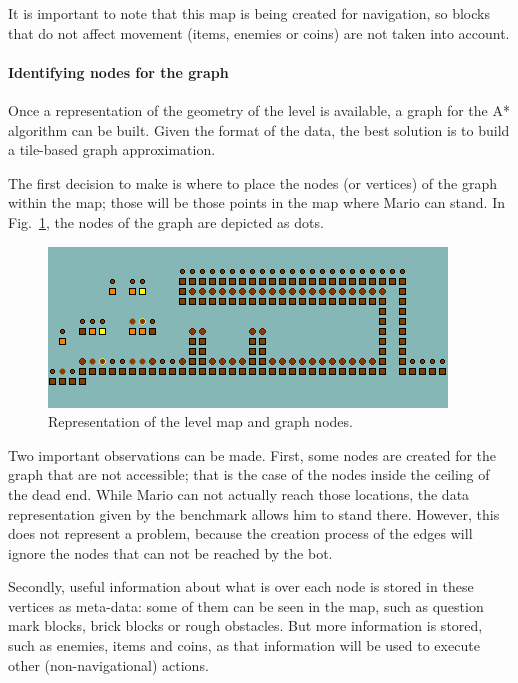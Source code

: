 \documentclass[conference]{IEEEtran}
\begin{document}
It is important to note that this map is being created for navigation, so
blocks that do not affect movement (items, enemies or 
coins) are not taken into account.

\paragraph{Identifying nodes for the graph}

Once a representation of the geometry of the level is available,
a graph for the A* algorithm can be built. Given the format of the data, the
best solution is to build a tile-based graph approximation.

The first decision to make is where to place the nodes (or vertices) of the graph 
within the map; those will be those points in the map where
Mario can stand. In Fig.~\ref{fig:trapNodes}, the nodes of the graph are
depicted as dots.

\begin{figure} [ht]
	\begin{center}
	\includegraphics[scale=0.75]{images/trapNodes}
	\caption{Representation of the level map and graph nodes.}
	\label{fig:trapNodes}
	\end{center}
\end{figure}

Two important observations can be made. First, 
some nodes are created for the graph that are not accessible;
that is the case of the nodes inside the ceiling of the dead end. While 
Mario can not actually reach those locations, the data representation given by the
benchmark allows him to stand there. However, this does not represent a problem, 
because the creation process of the edges will ignore the nodes that can not be reached
by the bot.

Secondly, useful information about what is over each node is stored in these vertices 
as meta-data: some of them can be seen in the map, such as question mark blocks, brick blocks
or rough obstacles. But more information is stored, such as enemies, items and coins, as that information will 
be used to execute other (non-navigational) actions. 
\end{document}
